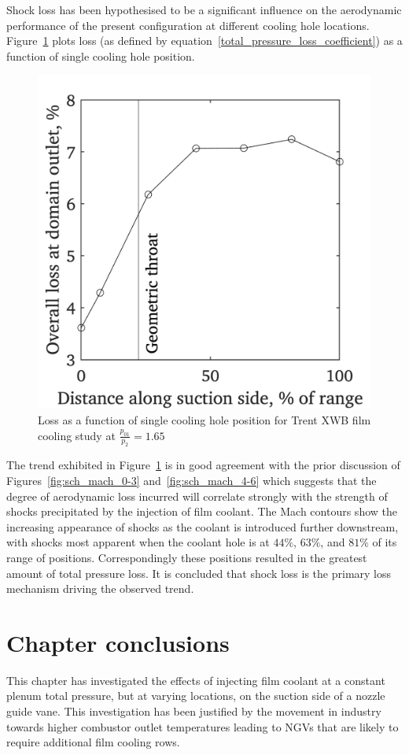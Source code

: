 \documentclass[a4paper, 11pt, oneside]{report}
\begin{document}
Shock loss has been hypothesised to be a significant influence on the aerodynamic performance of the present configuration at different cooling hole locations. Figure~\ref{fig:sch_hole_location_vs_loss} plots loss (as defined by equation~\ref{total_pressure_loss_coefficient}) as a function of single cooling hole position.
    
    \begin{figure}[H]
      \centering
      \includegraphics[width=.45\textwidth]{figs/sch_hole_location_vs_loss.png}
      \caption{Loss as a function of single cooling hole position for Trent XWB film cooling study at $\frac{p_{01}}{p_2}=1.65$}
      \label{fig:sch_hole_location_vs_loss}
\end{figure}

The trend exhibited in Figure~\ref{fig:sch_hole_location_vs_loss} is in good agreement with the prior discussion of Figures~\ref{fig:sch_mach_0-3} and~\ref{fig:sch_mach_4-6} which suggests that the degree of aerodynamic loss incurred will correlate strongly with the strength of shocks precipitated by the injection of film coolant. The Mach contours show the increasing appearance of shocks as the coolant is introduced further downstream, with shocks most apparent when the coolant hole is at $44\%$, $63\%$, and $81\%$ of its range of positions. Correspondingly these positions resulted in the greatest amount of total pressure loss. It is concluded that shock loss is the primary loss mechanism driving the observed trend.


\section{Chapter conclusions}

This chapter has investigated the effects of injecting film coolant at a constant plenum total pressure, but at varying locations, on the suction side of a nozzle guide vane. This investigation has been justified by the movement in industry towards higher combustor outlet temperatures leading to NGVs that are likely to require additional film cooling rows.
\end{document}
